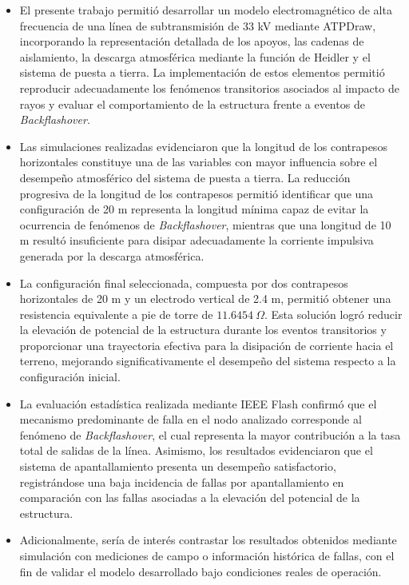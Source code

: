 \documentclass[12pt,letterpaper]{article}
\begin{document}
\begin{itemize}
    \item El presente trabajo permitió desarrollar un modelo electromagnético de alta frecuencia de una línea de subtransmisión de 33 kV mediante ATPDraw, incorporando la representación detallada de los apoyos, las cadenas de aislamiento, la descarga atmosférica mediante la función de Heidler y el sistema de puesta a tierra. La implementación de estos elementos permitió reproducir adecuadamente los fenómenos transitorios asociados al impacto de rayos y evaluar el comportamiento de la estructura frente a eventos de \textit{Backflashover}.

    \item Las simulaciones realizadas evidenciaron que la longitud de los contrapesos horizontales constituye una de las variables con mayor influencia sobre el desempeño atmosférico del sistema de puesta a tierra. La reducción progresiva de la longitud de los contrapesos permitió identificar que una configuración de 20 m representa la longitud mínima capaz de evitar la ocurrencia de fenómenos de \textit{Backflashover}, mientras que una longitud de 10 m resultó insuficiente para disipar adecuadamente la corriente impulsiva generada por la descarga atmosférica.

    \item La configuración final seleccionada, compuesta por dos contrapesos horizontales de 20 m y un electrodo vertical de 2.4 m, permitió obtener una resistencia equivalente a pie de torre de $11.6454\ \Omega$. Esta solución logró reducir la elevación de potencial de la estructura durante los eventos transitorios y proporcionar una trayectoria efectiva para la disipación de corriente hacia el terreno, mejorando significativamente el desempeño del sistema respecto a la configuración inicial.

    \item La evaluación estadística realizada mediante IEEE Flash confirmó que el mecanismo predominante de falla en el nodo analizado corresponde al fenómeno de \textit{Backflashover}, el cual representa la mayor contribución a la tasa total de salidas de la línea. Asimismo, los resultados evidenciaron que el sistema de apantallamiento presenta un desempeño satisfactorio, registrándose una baja incidencia de fallas por apantallamiento en comparación con las fallas asociadas a la elevación del potencial de la estructura.

    \item Adicionalmente, sería de interés contrastar los resultados obtenidos mediante simulación con mediciones de campo o información histórica de fallas, con el fin de validar el modelo desarrollado bajo condiciones reales de operación.


\end{itemize}
\end{document}
